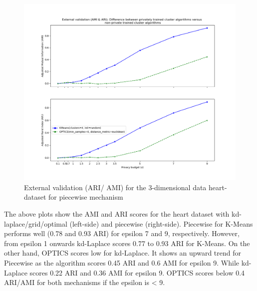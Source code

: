 \begin{figure}[H]
\begin{minipage}[c]{0.60\textwidth}
        \includegraphics[width=1\textwidth]{Results/3d-piecewise/heart-dataset/ami-and-ari.png}
        \caption{External validation (ARI/ AMI) for the 3-dimensional data heart-dataset for piecewise mechanism}
        \label{fig:external-validation-heart-dataset_comparison_3d-piecewise}
    \end{minipage}
\end{figure}
The above plots show the AMI and ARI scores for the heart dataset with kd-laplace/grid/optimal (left-side) and piecewise (right-side).
Piecewise for K-Means performs well (0.78 and 0.93 ARI) for epsilon 7 and 9, respectively.
However, from epsilon 1 onwards kd-Laplace scores 0.77 to 0.93 ARI for K-Means.
On the other hand, OPTICS scores low for kd-Laplace.
It shows an upward trend for Piecewise as the algorithm scores 0.45 ARI and 0.6 AMI for epsilon 9.
While kd-Laplace scores 0.22 ARI and 0.36 AMI for epsilon 9.
OPTICS scores below 0.4 ARI/AMI for both mechanisms if the epsilon is < 9.

